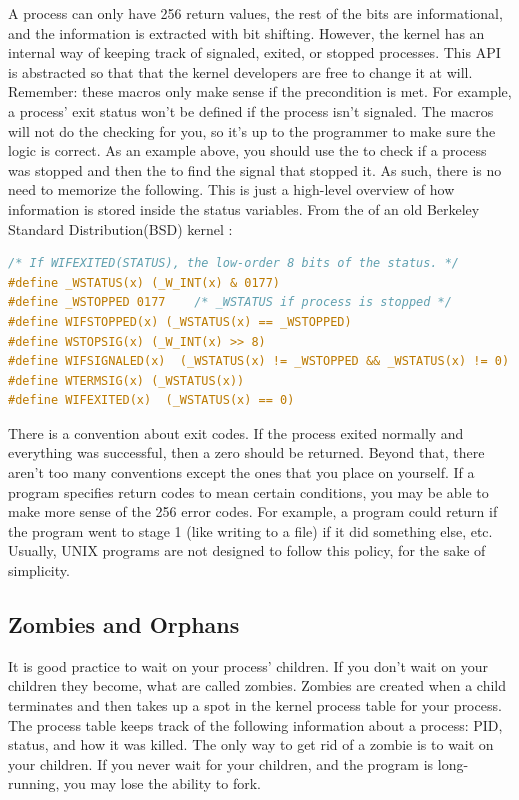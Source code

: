 A process can only have 256 return values, the rest of the bits are informational, and the information is extracted with bit shifting.
However, the kernel has an internal way of keeping track of signaled, exited, or stopped processes.
This API is abstracted so that that the kernel developers are free to change it at will.
Remember: these macros only make sense if the precondition is met.
For example, a process' exit status won't be defined if the process isn't signaled.
The macros will not do the checking for you, so it's up to the programmer to make sure the logic is correct.
As an example above, you should use the  to check if a process was stopped and then the  to find the signal that stopped it.
As such, there is no need to memorize the following. This is just a high-level overview of how information is stored inside the status variables. From the  of an old Berkeley Standard Distribution(BSD) kernel \cite{sys/wait.h}:

\begin{lstlisting}[language=C]
/* If WIFEXITED(STATUS), the low-order 8 bits of the status. */
#define _WSTATUS(x) (_W_INT(x) & 0177)
#define _WSTOPPED 0177    /* _WSTATUS if process is stopped */
#define WIFSTOPPED(x) (_WSTATUS(x) == _WSTOPPED)
#define WSTOPSIG(x) (_W_INT(x) >> 8)
#define WIFSIGNALED(x)  (_WSTATUS(x) != _WSTOPPED && _WSTATUS(x) != 0)
#define WTERMSIG(x) (_WSTATUS(x))
#define WIFEXITED(x)  (_WSTATUS(x) == 0)
\end{lstlisting}

There is a convention about exit codes.
If the process exited normally and everything was successful, then a zero should be returned.
Beyond that, there aren't too many conventions except the ones that you place on yourself.
If a program specifies return codes to mean certain conditions, you may be able to make more sense of the 256 error codes.
For example, a program could return  if the program went to stage 1 (like writing to a file)  if it did something else, etc.
Usually, UNIX programs are not designed to follow this policy, for the sake of simplicity.


\subsection{Zombies and Orphans}

It is good practice to wait on your process' children.
If you don't wait on your children they become, what are called zombies.
Zombies are created when a child terminates and then takes up a spot in the kernel process table for your process.
The process table keeps track of the following information about a process: PID, status, and how it was killed.
The only way to get rid of a zombie is to wait on your children.
If you never wait for your children, and the program is long-running, you may lose the ability to fork.

